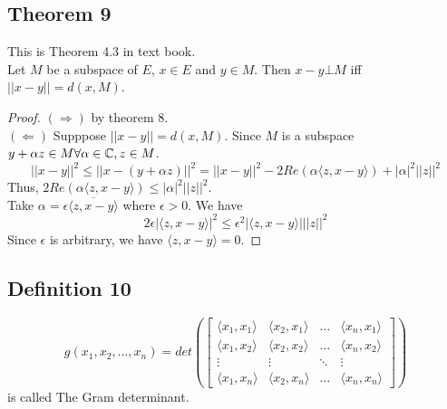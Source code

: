 \documentclass{article}
\begin{document}
\subsection*{Theorem 9}
This is Theorem 4.3 in text book.\\
Let $M$ be a subspace of $E$, $x\in E$ and $y\in M$. Then $x-y\bot M$ iff $||x-y||=d(x,M)$.
\begin{proof}
$(\Rightarrow)$ by theorem 8.\\
$(\Leftarrow)$ Supppose $||x-y||=d(x,M)$. Since $M$ is a subspace $y+\alpha z \in M \forall \alpha \in \Bbb{C}, z\in M$.
\[
||x-y||^2 \leq||x-(y+\alpha z)||^2=||x-y||^2-2Re(\alpha \langle z, x-y \rangle)+|\alpha|^2 ||z||^2
\]
Thus, $2Re(\alpha\langle z, x-y\rangle)\leq |\alpha|^2||z||^2$.\\
Take $\alpha=\epsilon\overline{\langle z, x-y \rangle}$ where $\epsilon >0$. We have
\[
2\epsilon|\langle z, x-y \rangle|^2 \leq \epsilon^2 | \langle z, x-y\rangle | ||z||^2
\]
Since $\epsilon$ is arbitrary, we have $\langle z, x-y\rangle = 0$.
\end{proof}
\subsection*{Definition 10}
\[
g(x_1,x_2,...,x_n)=det(
\begin{bmatrix}
\langle x_1, x_1 \rangle & \langle x_2, x_1 \rangle & \dots & \langle x_n, x_1 \rangle \\
\langle x_1, x_2 \rangle & \langle x_2, x_2 \rangle & \dots & \langle x_n, x_2 \rangle \\
\vdots & \vdots & \ddots & \vdots \\
\langle x_1, x_n \rangle & \langle x_2, x_n \rangle & \dots & \langle x_n, x_n \rangle 
\end{bmatrix}
)
\]
is called The Gram determinant.
\end{document}
